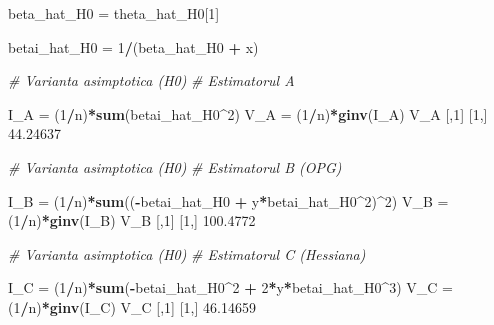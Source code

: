 \documentclass[]{article}
\newenvironment{Shaded}{\begin{snugshade}}{\end{snugshade}}
\newcommand{\CommentTok}[1]{\textcolor[rgb]{0.56,0.35,0.01}{\textit{#1}}}
\newcommand{\DecValTok}[1]{\textcolor[rgb]{0.00,0.00,0.81}{#1}}
\newcommand{\FloatTok}[1]{\textcolor[rgb]{0.00,0.00,0.81}{#1}}
\newcommand{\KeywordTok}[1]{\textcolor[rgb]{0.13,0.29,0.53}{\textbf{#1}}}
\newcommand{\NormalTok}[1]{#1}
\newcommand{\OperatorTok}[1]{\textcolor[rgb]{0.81,0.36,0.00}{\textbf{#1}}}
\newcommand{\StringTok}[1]{\textcolor[rgb]{0.31,0.60,0.02}{#1}}
\begin{document}
\begin{Shaded}
\begin{Highlighting}[]
\NormalTok{beta_hat_H0 =}\StringTok{ }\NormalTok{theta_hat_H0[}\DecValTok{1}\NormalTok{]}

\NormalTok{betai_hat_H0 =}\StringTok{ }\DecValTok{1}\OperatorTok{/}\NormalTok{(beta_hat_H0 }\OperatorTok{+}\StringTok{ }\NormalTok{x)}

\CommentTok{# Varianta asimptotica (H0)}
\CommentTok{# Estimatorul A}

\NormalTok{I_A =}\StringTok{ }\NormalTok{(}\DecValTok{1}\OperatorTok{/}\NormalTok{n)}\OperatorTok{*}\KeywordTok{sum}\NormalTok{(betai_hat_H0}\OperatorTok{^}\DecValTok{2}\NormalTok{)}
\NormalTok{V_A =}\StringTok{ }\NormalTok{(}\DecValTok{1}\OperatorTok{/}\NormalTok{n)}\OperatorTok{*}\KeywordTok{ginv}\NormalTok{(I_A)}
\NormalTok{V_A}
\NormalTok{         [,}\DecValTok{1}\NormalTok{]}
\NormalTok{[}\DecValTok{1}\NormalTok{,] }\FloatTok{44.24637}
\end{Highlighting}
\end{Shaded}

\begin{Shaded}
\begin{Highlighting}[]
\CommentTok{# Varianta asimptotica (H0)}
\CommentTok{# Estimatorul B (OPG)}

\NormalTok{I_B =}\StringTok{ }\NormalTok{(}\DecValTok{1}\OperatorTok{/}\NormalTok{n)}\OperatorTok{*}\KeywordTok{sum}\NormalTok{((}\OperatorTok{-}\NormalTok{betai_hat_H0 }\OperatorTok{+}\StringTok{ }\NormalTok{y}\OperatorTok{*}\NormalTok{betai_hat_H0}\OperatorTok{^}\DecValTok{2}\NormalTok{)}\OperatorTok{^}\DecValTok{2}\NormalTok{)}
\NormalTok{V_B =}\StringTok{ }\NormalTok{(}\DecValTok{1}\OperatorTok{/}\NormalTok{n)}\OperatorTok{*}\KeywordTok{ginv}\NormalTok{(I_B)}
\NormalTok{V_B}
\NormalTok{         [,}\DecValTok{1}\NormalTok{]}
\NormalTok{[}\DecValTok{1}\NormalTok{,] }\FloatTok{100.4772}
\end{Highlighting}
\end{Shaded}

\begin{Shaded}
\begin{Highlighting}[]
\CommentTok{# Varianta asimptotica (H0)}
\CommentTok{# Estimatorul C (Hessiana)}

\NormalTok{I_C =}\StringTok{ }\NormalTok{(}\DecValTok{1}\OperatorTok{/}\NormalTok{n)}\OperatorTok{*}\KeywordTok{sum}\NormalTok{(}\OperatorTok{-}\NormalTok{betai_hat_H0}\OperatorTok{^}\DecValTok{2} \OperatorTok{+}\StringTok{ }\DecValTok{2}\OperatorTok{*}\NormalTok{y}\OperatorTok{*}\NormalTok{betai_hat_H0}\OperatorTok{^}\DecValTok{3}\NormalTok{)}
\NormalTok{V_C =}\StringTok{ }\NormalTok{(}\DecValTok{1}\OperatorTok{/}\NormalTok{n)}\OperatorTok{*}\KeywordTok{ginv}\NormalTok{(I_C)}
\NormalTok{V_C}
\NormalTok{         [,}\DecValTok{1}\NormalTok{]}
\NormalTok{[}\DecValTok{1}\NormalTok{,] }\FloatTok{46.14659}
\end{Highlighting}
\end{Shaded}
\end{document}
